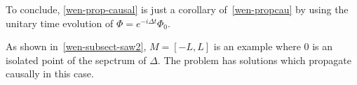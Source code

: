 %
To conclude, 
\cref{wen-prop-causal} is just a corollary of~\cref{wen-propcau} by using the unitary time evolution of $\Phi = e^{-i\Delta t}\Phi_0$.
\begin{remark}
As shown in~\cref{wen-subsect-saw2}, $M = [-L,L]$ is an example where 0 is an isolated point of the sepctrum of $\Delta$. 
The problem has solutions which propagate causally in this case.
\end{remark}
%
%




